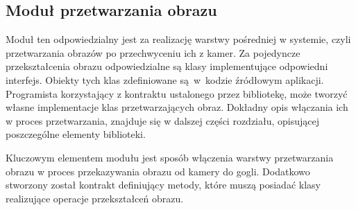 \documentclass[a4paper,11pt,twoside]{report}
\theoremstyle{definition}
\begin{document}
\subsection{Moduł przetwarzania obrazu}

Moduł ten odpowiedzialny jest za realizację warstwy pośredniej w  systemie, czyli przetwarzania obrazów po przechwyceniu ich z kamer. Za pojedyncze przekształcenia obrazu odpowiedzialne są klasy implementujące odpowiedni interfejs. Obiekty tych klas zdefiniowane są~w~kodzie źródłowym aplikacji. Programista korzystający z kontraktu ustalonego przez bibliotekę, może tworzyć własne implementacje klas przetwarzających obraz. Dokładny opis włączania ich w proces przetwarzania, znajduje się w dalszej części rozdziału, opisującej poszczególne elementy biblioteki.

Kluczowym elementem modułu jest sposób włączenia warstwy przetwarzania obrazu w proces przekazywania obrazu od kamery do gogli. Dodatkowo stworzony został kontrakt definiujący metody, które muszą posiadać klasy realizujące operacje przekształceń obrazu.

\pagebreak
\end{document}
